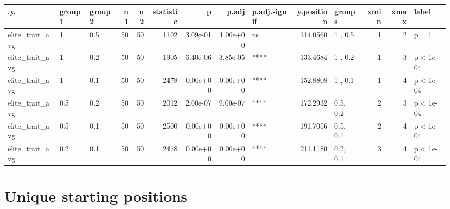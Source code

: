 \documentclass[]{book}
\begin{document}
\begin{tabular}{l|l|l|r|r|r|r|r|l|r|l|r|r|l}
\hline
.y. & group1 & group2 & n1 & n2 & statistic & p & p.adj & p.adj.signif & y.position & groups & xmin & xmax & label\\
\hline
elite\_trait\_avg & 1 & 0.5 & 50 & 50 & 1102 & 3.09e-01 & 1.00e+00 & ns & 114.0560 & 1  , 0.5 & 1 & 2 & p = 1\\
\hline
elite\_trait\_avg & 1 & 0.2 & 50 & 50 & 1905 & 6.40e-06 & 3.85e-05 & **** & 133.4684 & 1  , 0.2 & 1 & 3 & p < 1e-04\\
\hline
elite\_trait\_avg & 1 & 0.1 & 50 & 50 & 2478 & 0.00e+00 & 0.00e+00 & **** & 152.8808 & 1  , 0.1 & 1 & 4 & p < 1e-04\\
\hline
elite\_trait\_avg & 0.5 & 0.2 & 50 & 50 & 2012 & 2.00e-07 & 9.00e-07 & **** & 172.2932 & 0.5, 0.2 & 2 & 3 & p < 1e-04\\
\hline
elite\_trait\_avg & 0.5 & 0.1 & 50 & 50 & 2500 & 0.00e+00 & 0.00e+00 & **** & 191.7056 & 0.5, 0.1 & 2 & 4 & p < 1e-04\\
\hline
elite\_trait\_avg & 0.2 & 0.1 & 50 & 50 & 2478 & 0.00e+00 & 0.00e+00 & **** & 211.1180 & 0.2, 0.1 & 3 & 4 & p < 1e-04\\
\hline
\end{tabular}

\hypertarget{unique-starting-positions-9}{%
\section{Unique starting positions}\label{unique-starting-positions-9}}
\end{document}
